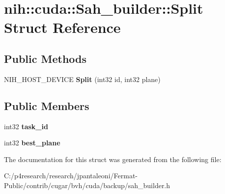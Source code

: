 \hypertarget{structnih_1_1cuda_1_1_sah__builder_1_1_split}{}\section{nih\+:\+:cuda\+:\+:Sah\+\_\+builder\+:\+:Split Struct Reference}
\label{structnih_1_1cuda_1_1_sah__builder_1_1_split}
\subsection*{Public Methods}
\begin{DoxyCompactItemize}
\item 
\mbox{\label{structnih_1_1cuda_1_1_sah__builder_1_1_split_acd5358f19500d3b3a424bf51e898d416}} 
N\+I\+H\+\_\+\+H\+O\+S\+T\+\_\+\+D\+E\+V\+I\+CE {\bfseries Split} (int32 id, int32 plane)
\end{DoxyCompactItemize}
\subsection*{Public Members}
\begin{DoxyCompactItemize}
\item 
\mbox{\label{structnih_1_1cuda_1_1_sah__builder_1_1_split_aba7f0b702f61ee28d55501ec45191f0f}} 
int32 {\bfseries task\+\_\+id}
\item 
\mbox{\label{structnih_1_1cuda_1_1_sah__builder_1_1_split_a1223d0b86ef5128db5f026cacb92ed89}} 
int32 {\bfseries best\+\_\+plane}
\end{DoxyCompactItemize}


The documentation for this struct was generated from the following file\+:\begin{DoxyCompactItemize}
\item 
C\+:/p4research/research/jpantaleoni/\+Fermat-\/\+Public/contrib/cugar/bvh/cuda/backup/sah\+\_\+builder.\+h\end{DoxyCompactItemize}
